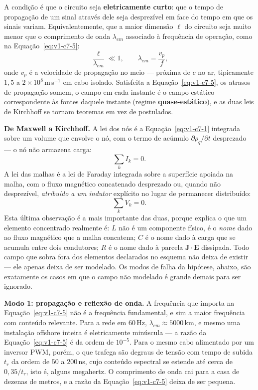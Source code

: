 \documentclass[12pt,a4paper]{article}
\numberwithin{equation}{section}
\numberwithin{table}{section}
\numberwithin{figure}{section}
\begin{document}
A condição é que o circuito seja \textbf{eletricamente curto}: que o tempo de
propagação de um sinal através dele seja desprezível em face do tempo em que
os sinais variam. Equivalentemente, que a maior dimensão $\ell$ do circuito
seja muito menor que o comprimento de onda $\lambda_{em}$ associado à
frequência de operação, como na Equação~\eqref{eq:v1-c7-5}:
\begin{equation}\label{eq:v1-c7-5}
\frac{\ell}{\lambda_{em}} \ll 1,
\qquad \lambda_{em} = \frac{v_p}{f},
\end{equation}
onde $v_p$ é a velocidade de propagação no meio --- próxima de $c$ no ar,
tipicamente $1{,}5$ a $2\times10^{8}\,$m\,s$^{-1}$ em cabo isolado. Satisfeita a
Equação~\eqref{eq:v1-c7-5}, os atrasos de propagação somem, o campo em cada
instante é o campo estático correspondente às fontes daquele instante (regime
\textbf{quase-estático}), e as duas leis de Kirchhoff se tornam teoremas em vez
de postulados.

\textbf{De Maxwell a Kirchhoff.} A lei dos nós é a
Equação~\eqref{eq:v1-c7-1} integrada sobre um volume que envolve o nó, com o
termo de acúmulo $\partial\rho_q/\partial t$ desprezado --- o nó não armazena
carga:
\begin{equation}\label{eq:v1-c7-6}
\sum_k I_k = 0 .
\end{equation}
A lei das malhas é a lei de Faraday integrada sobre a superfície apoiada na
malha, com o fluxo magnético concatenado desprezado ou, quando não desprezível,
\emph{atribuído a um indutor} explícito no lugar de permanecer distribuído:
\begin{equation}\label{eq:v1-c7-7}
\sum_k V_k = 0 .
\end{equation}
Esta última observação é a mais importante das duas, porque explica o que um
elemento concentrado realmente é: $L$ não é um componente físico, é o
\emph{nome} dado ao fluxo magnético que a malha concatena; $C$ é o nome dado à
carga que se acumula entre dois condutores; $R$ é o nome dado à parcela
$\mathbf{J}\cdot\mathbf{E}$ dissipada. Todo campo que sobra fora dos elementos
declarados no esquema não deixa de existir --- ele apenas deixa de ser
modelado. Os modos de falha da hipótese, abaixo, são exatamente os casos em que
o campo não modelado é grande demais para ser ignorado.

\textbf{Modo 1: propagação e reflexão de onda.} A frequência que importa na
Equação~\eqref{eq:v1-c7-5} não é a frequência fundamental, e sim a maior
frequência com conteúdo relevante. Para a rede em $60\,$Hz,
$\lambda_{em}\approx 5000\,$km, e mesmo uma instalação offshore inteira é
eletricamente minúscula --- a razão da Equação~\eqref{eq:v1-c7-5} é da ordem de
$10^{-5}$. Para o mesmo cabo alimentado por um inversor PWM, porém, o que
trafega são degraus de tensão com tempo de subida $t_r$ da ordem de
$50$ a $200\,$ns, cujo conteúdo espectral se estende até cerca de
$0{,}35/t_r$, isto é, alguns megahertz. O comprimento de onda cai para a casa
de dezenas de metros, e a razão da Equação~\eqref{eq:v1-c7-5} deixa de ser
pequena.
\end{document}
